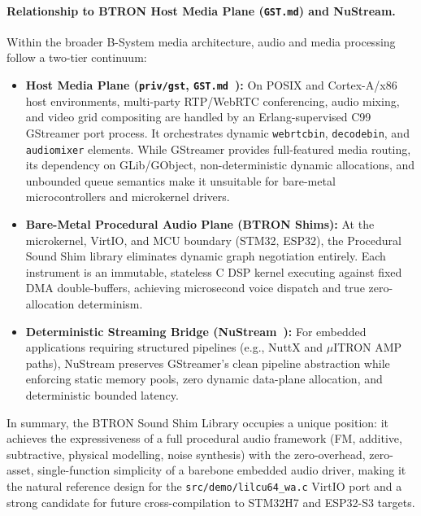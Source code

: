 \documentclass[10pt,journal,compsoc,twocolumn]{article}
\begin{document}
\paragraph{Relationship to BTRON Host Media Plane (\texttt{GST.md}) and NuStream.}
Within the broader B-System media architecture, audio and media processing
follow a two-tier continuum:
\begin{itemize}[leftmargin=*]
    \item \textbf{Host Media Plane (\texttt{priv/gst}, \texttt{GST.md}~\cite{gst_mcu}):}
    On POSIX and Cortex-A/x86 host environments, multi-party RTP/WebRTC conferencing,
    audio mixing, and video grid compositing are handled by an Erlang-supervised C99
    GStreamer port process. It orchestrates dynamic \texttt{webrtcbin}, \texttt{decodebin},
    and \texttt{audiomixer} elements. While GStreamer provides full-featured media routing,
    its dependency on GLib/GObject, non-deterministic dynamic allocations, and unbounded
    queue semantics make it unsuitable for bare-metal microcontrollers and microkernel drivers.
    \item \textbf{Bare-Metal Procedural Audio Plane (BTRON Shims):}
    At the microkernel, VirtIO, and MCU boundary (STM32, ESP32), the Procedural Sound
    Shim library eliminates dynamic graph negotiation entirely. Each instrument is an
    immutable, stateless C DSP kernel executing against fixed DMA double-buffers,
    achieving microsecond voice dispatch and true zero-allocation determinism.
    \item \textbf{Deterministic Streaming Bridge (NuStream~\cite{gst_sync_rtp}):}
    For embedded applications requiring structured pipelines (e.g., NuttX and
    $\mu$ITRON AMP paths), NuStream preserves GStreamer's clean pipeline abstraction
    while enforcing static memory pools, zero dynamic data-plane allocation, and
    deterministic bounded latency.
\end{itemize}

In summary, the BTRON Sound Shim Library occupies a unique position:
it achieves the expressiveness of a full procedural audio framework
(FM, additive, subtractive, physical modelling, noise synthesis) with
the zero-overhead, zero-asset, single-function simplicity of a
barebone embedded audio driver, making it the natural reference design
for the \texttt{src/demo/lilcu64\_wa.c} VirtIO port and a strong
candidate for future cross-compilation to STM32H7 and ESP32-S3 targets.
\end{document}
